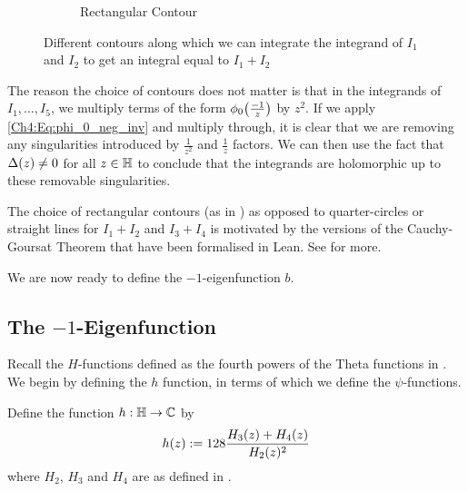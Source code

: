 \begin{figure}[ht]
\begin{subfigure}{0.3\textwidth}
        \label{Ch4:subfig:a_rect_contour}
        \caption{Rectangular Contour}
    \end{subfigure}
    \caption{\centering Different contours along which we can integrate the integrand of $I_1$ and $I_2$ to get an integral equal to $I_1 + I_2$}
    \label{Ch4:fig:a_contours}
\end{figure}

The reason the choice of contours does not matter is that in the integrands of $I_1, \ldots, I_5$, we multiply terms of the form $\phi_0\!\left( \frac{-1}{z} \right)$ by $z^2$. If we apply \eqref{Ch4:Eq:phi_0_neg_inv} and multiply through, it is clear that we are removing any singularities introduced by $\frac{1}{z^2}$ and $\frac{1}{z}$ factors. We can then use the fact that $\Delta\!\left( z \right) \neq 0$ for all $z \in \mathbb{H}$ to conclude that the integrands are holomorphic up to these removable singularities.

The choice of rectangular contours (as in ) as opposed to quarter-circles or straight lines for $I_1 + I_2$ and $I_3 + I_4$ is motivated by the versions of the Cauchy-Goursat Theorem that have been formalised in Lean. See  for more.


We are now ready to define the $-1$-eigenfunction $b$.

\subsection{The $-1$-Eigenfunction}
\label{Ch4:Subsec:b_def}

Recall the $H$-functions defined as the fourth powers of the Theta functions in . We begin by defining the $h$ function, in terms of which we define the $\psi$-functions.

\begin{boxdefinition}\label{Ch4:Def:h}
    Define the function $h : \mathbb{H} \to \mathbb{C}$ by
    \begin{align}
        h\!\left( z \right) := 128 \frac{H_3(z) + H_4(z)}{H_2(z)^2} \label{Ch4:Eq:h_def}
    \end{align}
    where $H_2$, $H_3$ and $H_4$ are as defined in .
\end{boxdefinition}

